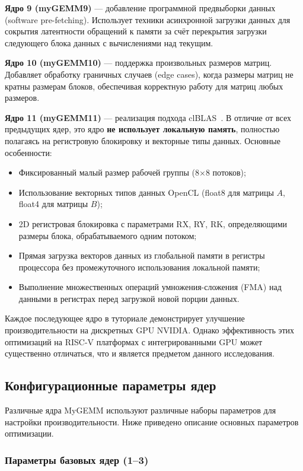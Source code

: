 \textbf{Ядро 9 (myGEMM9)} --- добавление программной предвыборки данных (software pre-fetching). Использует техники асинхронной загрузки данных для сокрытия латентности обращений к памяти за счёт перекрытия загрузки следующего блока данных с вычислениями над текущим.

\textbf{Ядро 10 (myGEMM10)} --- поддержка произвольных размеров матриц. Добавляет обработку граничных случаев (edge cases), когда размеры матриц не кратны размерам блоков, обеспечивая корректную работу для матриц любых размеров.

\textbf{Ядро 11 (myGEMM11)} --- реализация подхода clBLAS~\cite{clblas2015}. В отличие от всех предыдущих ядер, это ядро \textbf{не использует локальную память}, полностью полагаясь на регистровую блокировку и векторные типы данных. Основные особенности:

\begin{itemize}
    \item Фиксированный малый размер рабочей группы (8×8 потоков);
    \item Использование векторных типов данных OpenCL (float8 для матрицы $A$, float4 для матрицы $B$);
    \item 2D регистровая блокировка с параметрами RX, RY, RK, определяющими размеры блока, обрабатываемого одним потоком;
    \item Прямая загрузка векторов данных из глобальной памяти в регистры процессора без промежуточного использования локальной памяти;
    \item Выполнение множественных операций умножения-сложения (FMA) над данными в регистрах перед загрузкой новой порции данных.
\end{itemize}

Каждое последующее ядро в туториале демонстрирует улучшение производительности на дискретных GPU NVIDIA. Однако эффективность этих оптимизаций на RISC-V платформах с интегрированными GPU может существенно отличаться, что и является предметом данного исследования.

\subsection{Конфигурационные параметры ядер}

Различные ядра MyGEMM используют различные наборы параметров для настройки производительности. Ниже приведено описание основных параметров оптимизации.

\subsubsection{Параметры базовых ядер (1--3)}


